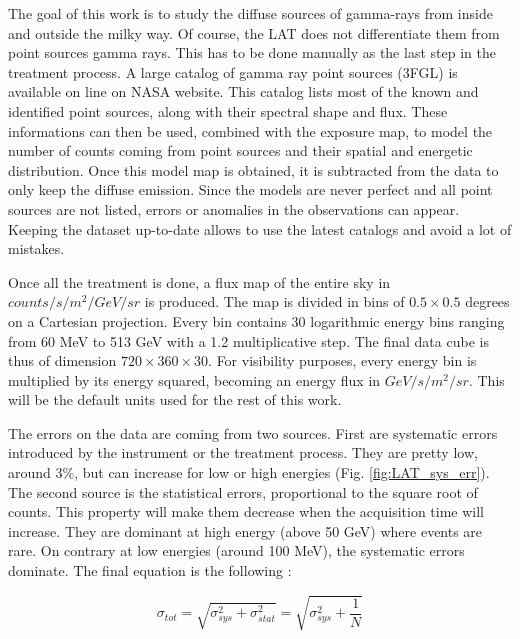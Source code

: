 The goal of this work is to study the diffuse sources of gamma-rays from inside and outside the milky way. Of course, the LAT does not differentiate them from point sources gamma rays. This has to be done manually as the last step in the treatment process. A large catalog of gamma ray point sources (3FGL) is available on line on NASA website. This catalog lists most of the known and identified point sources, along with their spectral shape and flux. These informations can then be used, combined with the exposure map, to model the number of counts coming from point sources and their spatial and energetic distribution. Once this model map is obtained, it is subtracted from the data to only keep the diffuse emission. Since the models are never perfect and all point sources are not listed, errors or anomalies in the observations can appear. Keeping the dataset up-to-date allows to use the latest catalogs and avoid a lot of mistakes.

Once all the treatment is done, a flux map of the entire sky in $counts/s/m^2/GeV/sr$ is produced. The map is divided in bins of $0.5 \times 0.5$ degrees on a Cartesian projection. Every bin contains 30 logarithmic energy bins ranging from 60 MeV to 513 GeV with a 1.2 multiplicative step. The final data cube is thus of dimension $720 \times 360 \times 30$. For visibility purposes, every energy bin is multiplied by its energy squared, becoming an energy flux in $GeV/s/m^2/sr$. This will be the default units used for the rest of this work.

The errors on the data are coming from two sources. First are systematic errors introduced by the instrument or the treatment process.   They are pretty low, around 3\%, but can increase for low or high energies (Fig. \ref{fig:LAT_sys_err}). The second source is the statistical errors, proportional to the square root of counts. This property will make them decrease when the acquisition time will increase. They are dominant at high energy (above 50 GeV) where events are rare. On contrary at low energies (around 100 MeV), the systematic errors dominate. The final equation is the following :

\begin{equation}
\sigma_{tot} =\sqrt{\sigma_{sys}^2 + \sigma_{stat}^2} = \sqrt{\sigma_{sys}^2 + \frac{1}{N}}
\end{equation}



